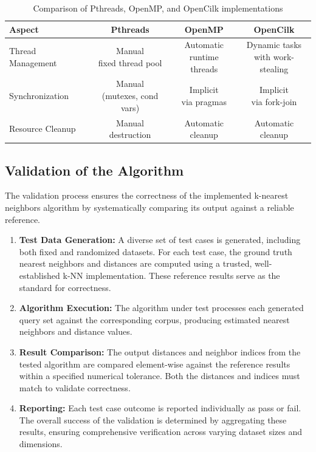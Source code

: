 \documentclass{article}
\begin{document}
\begin{table}[h]
\centering
\begin{tabular}{|l|c|c|c|}
\hline
\textbf{Aspect} & \textbf{Pthreads} & \textbf{OpenMP} & \textbf{OpenCilk} \\
\hline
Thread Management & \makecell{Manual \\ fixed thread pool} & \makecell{Automatic \\ runtime threads} & \makecell{Dynamic tasks \\ with work-stealing} \\
\hline
Synchronization & \makecell{Manual \\ (mutexes, cond vars)} & \makecell{Implicit \\ via pragmas} & \makecell{Implicit \\ via fork-join} \\
\hline
Resource Cleanup & \makecell{Manual \\ destruction} & \makecell{Automatic \\ cleanup} & \makecell{Automatic \\ cleanup} \\
\hline
\end{tabular}
\caption{Comparison of Pthreads, OpenMP, and OpenCilk implementations}
\end{table}

\subsection{Validation of the Algorithm}

The validation process ensures the correctness of the implemented k-nearest neighbors algorithm by 
systematically comparing its output against a reliable reference.

\begin{enumerate}
    \item \textbf{Test Data Generation:} A diverse set of test cases is generated, including both fixed and
    randomized datasets. For each test case, the ground truth nearest neighbors and distances are computed 
    using a trusted, well-established k-NN implementation. These reference results serve as the standard for
    correctness.
    
    \item \textbf{Algorithm Execution:} The algorithm under test processes each generated query set against 
    the corresponding corpus, producing estimated nearest neighbors and distance values.
    
    \item \textbf{Result Comparison:} The output distances and neighbor indices from the tested algorithm 
    are compared element-wise against the reference results within a specified numerical tolerance. Both 
    the distances and indices must match to validate correctness.
    
    \item \textbf{Reporting:} Each test case outcome is reported individually as pass or fail. The overall 
    success of the validation is determined by aggregating these results, ensuring comprehensive verification 
    across varying dataset sizes and dimensions.
\end{enumerate}
\end{document}
